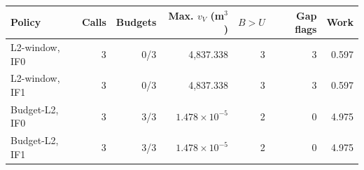 \begin{tabular}{lrrrrrr}
\toprule
Policy & Calls & Budgets & Max. $v_V$ (m$^3$) & $B>U$ & Gap flags & Work\\
\midrule
L2-window, IF0 & 3 & 0/3 & 4,837.338 & 3 & 3 & 0.597\\
L2-window, IF1 & 3 & 0/3 & 4,837.338 & 3 & 3 & 0.597\\
Budget-L2, IF0 & 3 & 3/3 & $1.478\times10^{-5}$ & 2 & 0 & 4.975\\
Budget-L2, IF1 & 3 & 3/3 & $1.478\times10^{-5}$ & 2 & 0 & 4.975\\
\bottomrule
\end{tabular}
